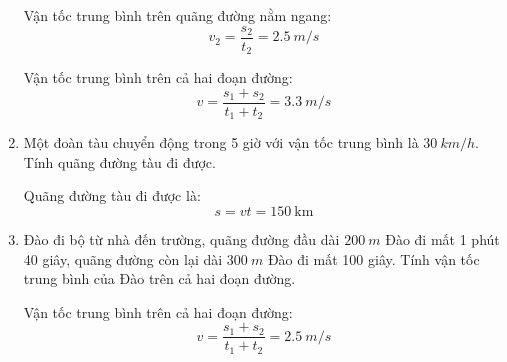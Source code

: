 \begin{enumerate}[label=\bfseries Câu \arabic*:]
{		Vận tốc trung bình trên quãng đường nằm ngang:
		$$v_2 = \dfrac{s_2}{t_2} = \SI{2.5}{m/s}$$
		
		Vận tốc trung bình trên cả hai đoạn đường:
		$$v= \dfrac{s_1 + s_2}{t_1 + t_2} = \SI{3.3}{m/s}$$
	}
	\item {}
	
	\cauhoi
	{Một đoàn tàu chuyển động trong 5 giờ với vận tốc trung bình là $\SI{30}{km/h}$. Tính quãng đường tàu đi được.
	}
	
	\loigiai
	{Quãng đường tàu đi được là:
		$$s=vt=150\ \text{km}$$
	}
	\item {}
	
	\cauhoi
	{Đào đi bộ từ nhà đến trường, quãng đường đầu dài $\SI{200}{m}$ Đào đi mất 1 phút 40 giây, quãng đường còn lại dài $\SI{300}{m}$ Đào đi mất 100 giây. Tính vận tốc trung bình của Đào trên cả hai đoạn đường.
	}
	
	\loigiai
	{
		Vận tốc trung bình trên cả hai đoạn đường:
		$$v= \dfrac{s_1 + s_2}{t_1 + t_2} = \SI{2.5}{m/s}$$
	}
\end{enumerate}